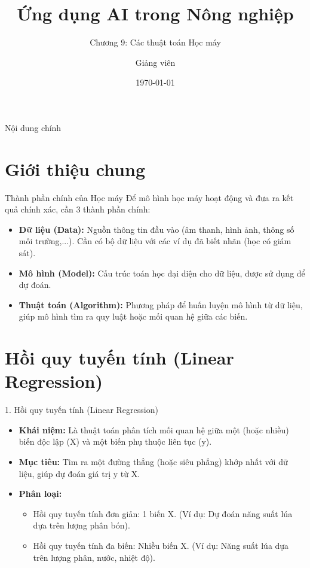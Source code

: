 \documentclass[aspectratio=169]{beamer}
\title[Các thuật toán Học máy]{Ứng dụng AI trong Nông nghiệp}
\subtitle{Chương 9: Các thuật toán Học máy}
\author{Giảng viên}
\institute{Đại học Đông Á}
\date{\today}
\begin{document}
\begin{frame}
    \titlepage
\end{frame}

\begin{frame}{Nội dung chính}
    \tableofcontents
\end{frame}

\section{Giới thiệu chung}
\begin{frame}{Thành phần chính của Học máy}
    Để mô hình học máy hoạt động và đưa ra kết quả chính xác, cần 3 thành phần chính:
    \begin{itemize}
        \item \textbf{Dữ liệu (Data):} Nguồn thông tin đầu vào (âm thanh, hình ảnh, thông số môi trường,...). Cần có bộ dữ liệu với các ví dụ đã biết nhãn (học có giám sát).
        \item \textbf{Mô hình (Model):} Cấu trúc toán học đại diện cho dữ liệu, được sử dụng để dự đoán.
        \item \textbf{Thuật toán (Algorithm):} Phương pháp để huấn luyện mô hình từ dữ liệu, giúp mô hình tìm ra quy luật hoặc mối quan hệ giữa các biến.
    \end{itemize}
\end{frame}

\section{Hồi quy tuyến tính (Linear Regression)}
\begin{frame}{1. Hồi quy tuyến tính (Linear Regression)}
    \begin{itemize}
        \item \textbf{Khái niệm:} Là thuật toán phân tích mối quan hệ giữa một (hoặc nhiều) biến độc lập (X) và một biến phụ thuộc liên tục (y).
        \item \textbf{Mục tiêu:} Tìm ra một đường thẳng (hoặc siêu phẳng) khớp nhất với dữ liệu, giúp dự đoán giá trị y từ X.
        \item \textbf{Phân loại:}
        \begin{itemize}
            \item Hồi quy tuyến tính đơn giản: 1 biến X. (Ví dụ: Dự đoán năng suất lúa dựa trên lượng phân bón).
            \item Hồi quy tuyến tính đa biến: Nhiều biến X. (Ví dụ: Năng suất lúa dựa trên lượng phân, nước, nhiệt độ).
        \end{itemize}
    \end{itemize}
\end{frame}
\end{document}
